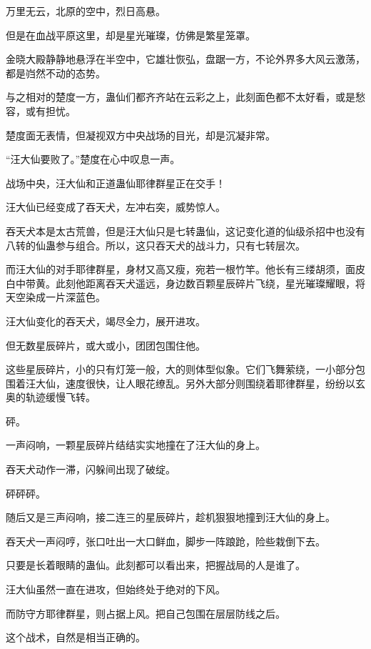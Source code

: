
\begin{this_body}



万里无云，北原的空中，烈日高悬。

但是在血战平原这里，却是星光璀璨，仿佛是繁星笼罩。

金晓大殿静静地悬浮在半空中，它雄壮恢弘，盘踞一方，不论外界多大风云激荡，都是岿然不动的态势。

与之相对的楚度一方，蛊仙们都齐齐站在云彩之上，此刻面色都不太好看，或是愁容，或有担忧。

楚度面无表情，但凝视双方中央战场的目光，却是沉凝非常。

“汪大仙要败了。”楚度在心中叹息一声。

战场中央，汪大仙和正道蛊仙耶律群星正在交手！

汪大仙已经变成了吞天犬，左冲右突，威势惊人。

吞天犬本是太古荒兽，但是汪大仙只是七转蛊仙，这记变化道的仙级杀招中也没有八转的仙蛊参与组合。所以，这只吞天犬的战斗力，只有七转层次。

而汪大仙的对手耶律群星，身材又高又瘦，宛若一根竹竿。他长有三缕胡须，面皮白中带黄。此刻他距离吞天犬遥远，身边数百颗星辰碎片飞绕，星光璀璨耀眼，将天空染成一片深蓝色。

汪大仙变化的吞天犬，竭尽全力，展开进攻。

但无数星辰碎片，或大或小，团团包围住他。

这些星辰碎片，小的只有灯笼一般，大的则体型似象。它们飞舞萦绕，一小部分包围着汪大仙，速度很快，让人眼花缭乱。另外大部分则围绕着耶律群星，纷纷以玄奥的轨迹缓慢飞转。

砰。

一声闷响，一颗星辰碎片结结实实地撞在了汪大仙的身上。

吞天犬动作一滞，闪躲间出现了破绽。

砰砰砰。

随后又是三声闷响，接二连三的星辰碎片，趁机狠狠地撞到汪大仙的身上。

吞天犬一声闷哼，张口吐出一大口鲜血，脚步一阵踉跄，险些栽倒下去。

只要是长着眼睛的蛊仙。此刻都可以看出来，把握战局的人是谁了。

汪大仙虽然一直在进攻，但始终处于绝对的下风。

而防守方耶律群星，则占据上风。把自己包围在层层防线之后。

这个战术，自然是相当正确的。


\end{this_body}
